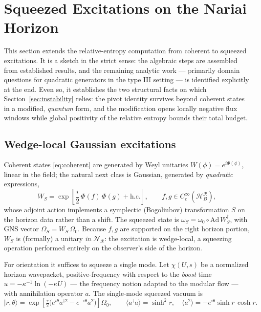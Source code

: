 \documentclass[11pt]{article}
\newcommand{\Nariai}{Nariai}
\begin{document}

\section{Squeezed Excitations on the \Nariai{} Horizon}
\label{app:squeezed}

This section extends the relative-entropy computation from coherent to squeezed excitations. It is a sketch in the strict sense: the algebraic steps are assembled from established results, and the remaining analytic work --- primarily domain questions for quadratic generators in the type III setting --- is identified explicitly at the end. Even so, it establishes the two structural facts on which Section~\ref{sec:instability} relies: the pivot identity survives beyond coherent states in a modified, \emph{quantum} form, and the modification opens locally negative flux windows while global positivity of the relative entropy bounds their total budget.

\subsection{Wedge-local Gaussian excitations}
\label{app:gaussian}

Coherent states \eqref{eq:coherent} are generated by Weyl unitaries $W(\phi) = e^{i\Phi(\phi)}$, linear in the field; the natural next class is Gaussian, generated by \emph{quadratic} expressions,
\begin{equation}
W_S = \exp\!\left[\frac{i}{2}\,\Phi(f)\,\Phi(g) + \mathrm{h.c.}\right],
\qquad f, g \in C^\infty_c(\mathcal{H}_B^{\mathcal{R}}),
\label{eq:squeeze-unitary}
\end{equation}
whose adjoint action implements a symplectic (Bogoliubov) transformation $S$ on the horizon data rather than a shift. The squeezed state is $\omega_S = \omega_0 \circ \mathrm{Ad}\,W_S^\dagger$, with GNS vector $\Omega_S = W_S\,\Omega_0$. Because $f, g$ are supported on the right horizon portion, $W_S$ is (formally) a unitary \emph{in} $\mathscr{N}_{\mathcal{R}}$: the excitation is wedge-local, a squeezing operation performed entirely on the observer's side of the horizon.

For orientation it suffices to squeeze a single mode. Let $\chi(U,s)$ be a normalized horizon wavepacket, positive-frequency with respect to the \emph{boost} time $u = -\kappa^{-1}\ln(-\kappa U)$ --- the frequency notion adapted to the modular flow --- with annihilation operator $a$. The single-mode squeezed vacuum is
\begin{equation}
|r, \theta\rangle
= \exp\!\left[\tfrac{r}{2}\big(e^{i\theta} a^{\dagger 2} - e^{-i\theta} a^2\big)\right] \Omega_0 ,
\qquad
\langle a^\dagger a\rangle = \sinh^2\! r,
\quad
\langle a^2 \rangle = -e^{i\theta}\sinh r\,\cosh r .
\label{eq:squeezed-state}
\end{equation}
\end{document}
